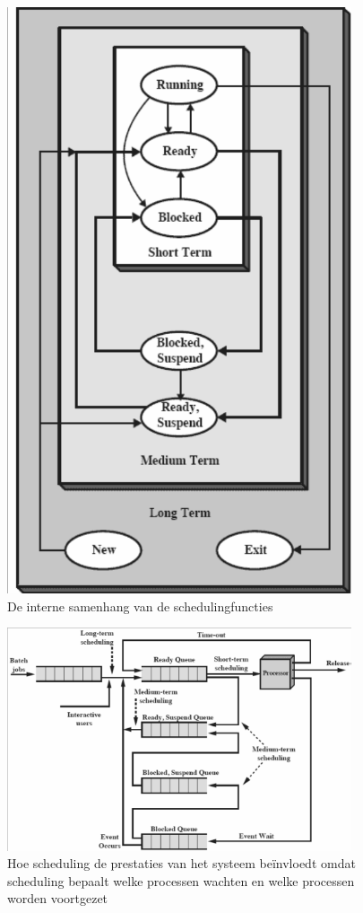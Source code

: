 \begin{figure}[htp]
    \centering
            \includegraphics[width=4in]{img/samenhangschedulingfuncties.png}
        \caption{De interne samenhang van de schedulingfuncties}
    \label{fig:De interne samenhang van de schedulingfuncties}
\end{figure}

\begin{figure}[htp]
    \centering
            \includegraphics[width=4in]{img/invloedscheduling.png}
        \caption{Hoe scheduling de prestaties van het systeem beïnvloedt omdat scheduling bepaalt welke processen wachten en welke processen worden voortgezet}
    \label{fig:Hoe scheduling de prestaties van het systeem beïnvloedt omdat scheduling bepaalt welke processen wachten en welke processen worden voortgezet}
\end{figure}

